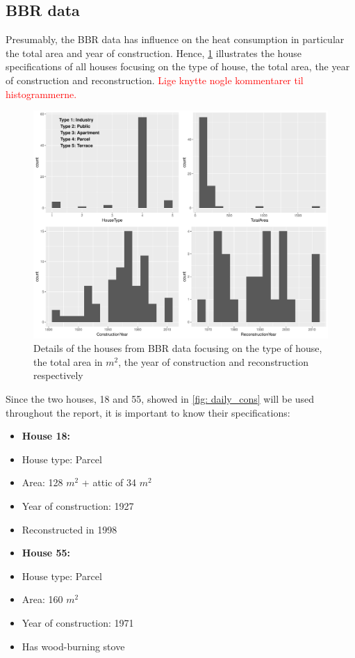 \subsection{BBR data}
Presumably, the BBR data has influence on the heat consumption in particular the total area and year of construction. Hence, \cref{fig: bbr_hist} illustrates the house specifications of all houses focusing on the type of house, the total area, the year of construction and reconstruction. \textcolor{red}{Lige knytte nogle kommentarer til histogrammerne.}
\begin{figure}
    \centering
    \includegraphics[width=1.\textwidth]{../../../figures/bbr_hist.pdf}
    \caption{Details of the houses from BBR data focusing on the type of house, the total area in $m^2$, the year of construction and reconstruction respectively}
    \label{fig: bbr_hist}
\end{figure}
Since the two houses, 18 and 55, showed in \cref{fig: daily_cons} will be used throughout the report, it is important to know their specifications:
\begin{multicols}{2}
    \begin{itemize}
        \item[]\textbf{House 18:}
        \item House type: Parcel
        \item Area: 128 $m^2$ + attic of 34 $m^2$
        \item Year of construction: 1927
        \item Reconstructed in 1998
    \end{itemize}
    \columnbreak
    \begin{itemize}
        \item[]\textbf{House 55:}
        \item House type: Parcel
        \item Area: 160 $m^2$ 
        \item Year of construction: 1971
        \item Has wood-burning stove 
    \end{itemize}
\end{multicols}
